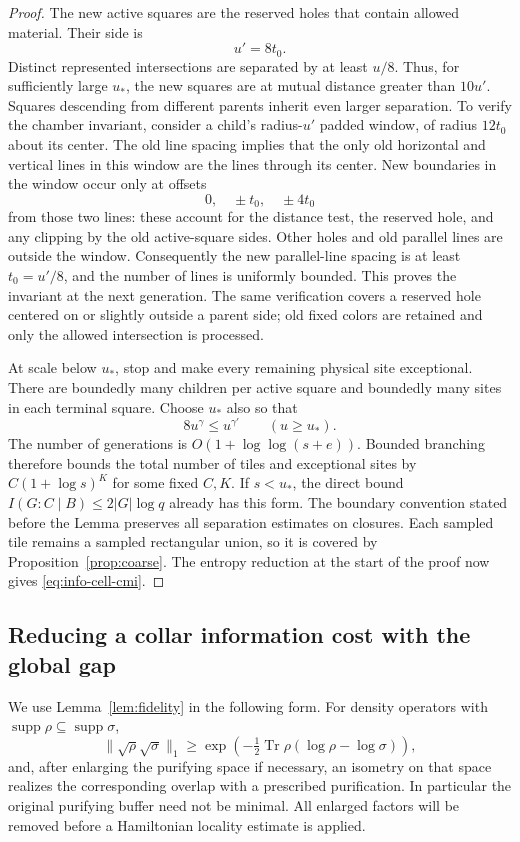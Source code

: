 \documentclass[11pt]{article}
\numberwithin{equation}{section}
\theoremstyle{definition}
\theoremstyle{remark}
\DeclareMathOperator{\Tr}{Tr}
\DeclareMathOperator{\supp}{supp}
\newcommand{\norm}[1]{\lVert #1\rVert}
\begin{document}
\begin{proof}
The new active squares are the reserved holes that contain allowed
material.  Their side is
\[
 u'=8t_0.
\]
Distinct represented intersections are separated by at least $u/8$.
Thus, for sufficiently large $u_*$, the new squares are at mutual
distance greater than $10u'$.  Squares descending from different
parents inherit even larger separation.  To verify the chamber
invariant, consider a child's radius-$u'$ padded window, of radius
$12t_0$ about its center.  The old line spacing implies that the only
old horizontal and vertical lines in this window are the lines through
its center.  New boundaries in the window occur only at offsets
\[
 0,\quad \pm t_0,\quad \pm4t_0
\]
from those two lines: these account for the distance test, the reserved
hole, and any clipping by the old active-square sides.  Other holes
and old parallel lines are outside the window.  Consequently the new
parallel-line spacing is at least $t_0=u'/8$, and the number of lines
is uniformly bounded.  This proves the invariant at the next generation.
The same verification covers a reserved hole centered on or slightly
outside a parent side; old fixed colors are retained and only the
allowed intersection is processed.

At scale below $u_*$, stop and make every remaining physical site
exceptional.  There are boundedly many children per active square and
boundedly many sites in each terminal square.  Choose $u_*$ also so that
\[
 8u^\gamma\le u^{\gamma'}\qquad(u\ge u_*).
\]
The number of generations is $O(1+\log\log(s+e))$.  Bounded branching
therefore bounds the total number of tiles and exceptional sites by
$C(1+\log s)^K$ for some fixed $C,K$.  If $s<u_*$, the direct bound
$I(G:C\mid B)\le2|G|\log q$ already has this form.  The boundary
convention stated before the Lemma preserves all separation estimates
on closures.  Each sampled tile remains a sampled rectangular union,
so it is covered by Proposition~\ref{prop:coarse}.  The entropy reduction
at the start of the proof now gives \eqref{eq:info-cell-cmi}.
\end{proof}

\subsection{Reducing a collar information cost with the global gap}

We use Lemma~\ref{lem:fidelity} in the following form.  For density
operators with $\supp\rho\subseteq\supp\sigma$,
\begin{equation}
 \norm{\sqrt\rho\sqrt\sigma}_1
 \ge \exp\left(-\tfrac12\Tr\rho(\log\rho-\log\sigma)\right),
 \label{eq:info-relative-entropy-overlap}
\end{equation}
and, after enlarging the purifying space if necessary, an isometry on
that space realizes the corresponding overlap with a prescribed
purification.  In particular the original purifying buffer need not
be minimal.  All enlarged factors will be removed before a Hamiltonian
locality estimate is applied.
\end{document}
